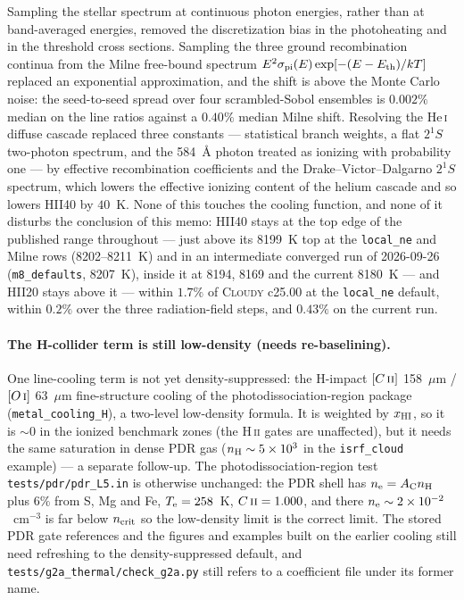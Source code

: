 \documentclass[english,a4paper]{my_memo}
\newcommand{\code}[1]{\texttt{#1}}
\newcommand{\Cloudy}{\textsc{Cloudy}}
\newcommand{\HII}{H\,\textsc{ii}}
\newcommand{\HeI}{He\,\textsc{i}}
\newcommand{\OI}{O\,\textsc{i}}
\newcommand{\CII}{C\,\textsc{ii}}
\newcommand{\Te}{T_{\rm e}}
\newcommand{\nel}{n_{\rm e}}
\newcommand{\nH}{n_{\rm H}}
\newcommand{\ncrit}{n_{\rm crit}}
\begin{document}
\noindent
Sampling the stellar spectrum at continuous photon energies, rather than at
band-averaged energies, removed the discretization bias in the photoheating and
in the threshold cross sections.  Sampling the three ground recombination
continua from the Milne free-bound spectrum
$E^2\sigma_{\rm pi}(E)\exp[-(E-E_{\rm th})/kT]$ replaced an exponential
approximation, and the shift is above the Monte Carlo noise: the seed-to-seed
spread over four scrambled-Sobol ensembles is $0.002\%$ median on the line
ratios against a $0.40\%$ median Milne shift.  Resolving the \HeI{} diffuse
cascade replaced three constants --- statistical branch weights, a flat
$2^1S$ two-photon spectrum, and the 584~\AA{} photon treated as ionizing with
probability one --- by effective recombination coefficients and the
Drake--Victor--Dalgarno $2^1S$ spectrum, which lowers the effective ionizing
content of the helium cascade and so lowers HII40 by $40$~K.  None of this
touches the cooling function, and none of it disturbs the conclusion of this
memo: HII40 stays at the top edge of the published range throughout ---
just above its 8199~K top at the \code{local\_ne} and Milne rows (8202--8211~K)
and in an intermediate converged run of 2026-09-26 (\code{m8\_defaults},
8207~K), inside it at 8194, 8169 and the current 8180~K --- and HII20 stays above it --- within $1.7\%$ of
\Cloudy{} c25.00 at the \code{local\_ne} default, within $0.2\%$ over the three
radiation-field steps, and $0.43\%$ on the current run.

\paragraph{The H-collider term is still low-density (needs re-baselining).}
One line-cooling term is not yet density-suppressed: the H-impact $[\CII{}]$
158~$\mu$m / $[\OI{}]$ 63~$\mu$m fine-structure cooling of the
photodissociation-region package (\code{metal\_cooling\_H}), a two-level
low-density formula.  It is weighted by $x_{\rm HI}$, so it is $\sim$0 in the
ionized benchmark zones (the \HII{} gates are unaffected), but it needs the
same saturation in dense PDR gas ($\nH \sim 5\times10^3$ in the
\code{isrf\_cloud} example) --- a separate follow-up.  The photodissociation-region
test \code{tests/pdr/pdr\_L5.in} is otherwise unchanged: the PDR shell has
$\nel = A_{\rm C}\nH$ plus $6\%$ from S, Mg and Fe, $\Te = 258$~K,
$\CII{} = 1.000$, and there $\nel \sim 2\times10^{-2}$~cm$^{-3}$ is far below
$\ncrit$ so the low-density limit is the correct limit.  The stored PDR gate
references and the figures and examples built on the earlier cooling still need
refreshing to the density-suppressed default, and
\code{tests/g2a\_thermal/check\_g2a.py} still refers to a coefficient file
under its former name.
\end{document}
